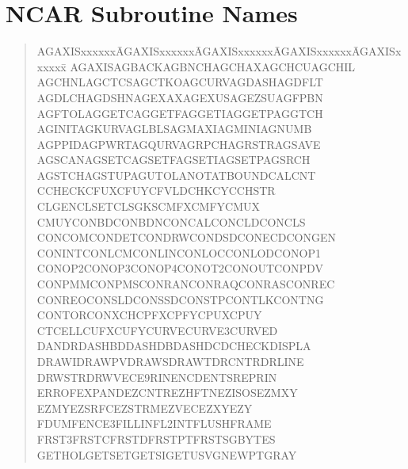 \newpage

\section{NCAR Subroutine Names} \label{list_sect}

\scriptsize
\begin{quote}
\begin{tabbing}
AGAXISxxxxxx\=AGAXISxxxxxx\=AGAXISxxxxxx\=AGAXISxxxxxx\=AGAXISxxxxxx\=\kill
AGAXIS\>AGBACK\>AGBNCH\>AGCHAX\>AGCHCU\>AGCHIL\\
AGCHNL\>AGCTCS\>AGCTKO\>AGCURV\>AGDASH\>AGDFLT\\
AGDLCH\>AGDSHN\>AGEXAX\>AGEXUS\>AGEZSU\>AGFPBN\\
AGFTOL\>AGGETC\>AGGETF\>AGGETI\>AGGETP\>AGGTCH\\
AGINIT\>AGKURV\>AGLBLS\>AGMAXI\>AGMINI\>AGNUMB\\
AGPPID\>AGPWRT\>AGQURV\>AGRPCH\>AGRSTR\>AGSAVE\\
AGSCAN\>AGSETC\>AGSETF\>AGSETI\>AGSETP\>AGSRCH\\
AGSTCH\>AGSTUP\>AGUTOL\>ANOTAT\>BOUND\>CALCNT\\
CCHECK\>CFUX\>CFUY\>CFVLD\>CHKCYC\>CHSTR\\
CLGEN\>CLSET\>CLSGKS\>CMFX\>CMFY\>CMUX\\
CMUY\>CONBD\>CONBDN\>CONCAL\>CONCLD\>CONCLS\\
CONCOM\>CONDET\>CONDRW\>CONDSD\>CONECD\>CONGEN\\
CONINT\>CONLCM\>CONLIN\>CONLOC\>CONLOD\>CONOP1\\
CONOP2\>CONOP3\>CONOP4\>CONOT2\>CONOUT\>CONPDV\\
CONPMM\>CONPMS\>CONRAN\>CONRAQ\>CONRAS\>CONREC\\
CONREO\>CONSLD\>CONSSD\>CONSTP\>CONTLK\>CONTNG\\
CONTOR\>CONXCH\>CPFX\>CPFY\>CPUX\>CPUY\\
CTCELL\>CUFX\>CUFY\>CURVE\>CURVE3\>CURVED\\
DANDR\>DASHBD\>DASHDB\>DASHDC\>DCHECK\>DISPLA\\
DRAWI\>DRAWPV\>DRAWS\>DRAWT\>DRCNTR\>DRLINE\\
DRWSTR\>DRWVEC\>E9RIN\>ENCD\>ENTSR\>EPRIN\\
ERROF\>EXPAND\>EZCNTR\>EZHFTN\>EZISOS\>EZMXY\\
EZMY\>EZSRFC\>EZSTRM\>EZVEC\>EZXY\>EZY\\
FDUM\>FENCE3\>FILLIN\>FL2INT\>FLUSH\>FRAME\\
FRST3\>FRSTC\>FRSTD\>FRSTPT\>FRSTS\>GBYTES\\
GETHOL\>GETSET\>GETSI\>GETUSV\>GNEWPT\>GRAY
\end{tabbing}


\end{quote}
